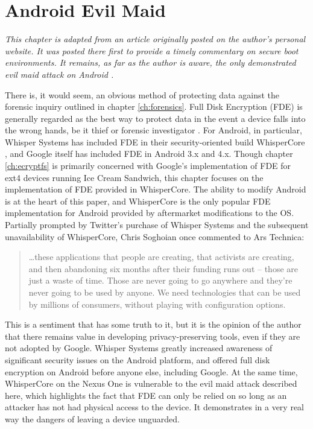 \chapter{Android Evil Maid}
\label{ch:fde}

\emph{This chapter is adapted from an article originally posted on the author's personal website. It was posted there first to
provide a timely commentary on secure boot environments. It remains, as far as the author is aware, the only demonstrated evil maid
attack on Android \cite{androidevilmaid}.}

There is, it would seem, an obvious method of protecting data against the forensic inquiry outlined in chapter \ref{ch:forensics}.
Full Disk Encryption (FDE) is generally regarded as the best way to protect data in the event a device falls into the wrong hands,
be it thief or forensic investigator \cite{fdeworks}.  For Android, in particular, Whisper Systems has included FDE in their
security-oriented build WhisperCore \cite{whispercore}, and Google itself has included FDE in Android 3.x and 4.x. Though chapter
\ref{ch:ecryptfs} is primarily concerned with Google's implementation of FDE for ext4 devices running Ice Cream Sandwich, this chapter
focuses on the implementation of FDE provided in WhisperCore.  The ability to modify Android is at
the heart of this paper, and WhisperCore is the only popular FDE implementation for Android provided by aftermarket modifications to
the OS.  Partially prompted by Twitter's purchase of Whisper Systems and the subsequent unavailability of WhisperCore, Chris
Soghoian once commented to Ars Technica: \begin{quote} 
\ldots these applications that people are creating, that activists are creating, and then abandoning six months after their funding
runs out -- those are just a waste of time. Those are never going to go anywhere and they're never going to be used by anyone. We
need technologies that can be used by millions of consumers, without playing with configuration options. \cite{arstechnica}
\end{quote}
This is a sentiment that has some truth to it, but it is the opinion of the author that there remains value in
developing privacy-preserving tools, even if they are not adopted by Google.  Whisper Systems greatly increased awareness of significant
security issues on the Android platform, and offered full disk encryption on Android before anyone else, including Google. 
At the same time, WhisperCore on the Nexus One is vulnerable to the evil maid attack described here, which highlights the fact that FDE can only be
relied on so long as an attacker has not had physical access to the device. It demonstrates in a very real way the dangers of
leaving a device unguarded. 

